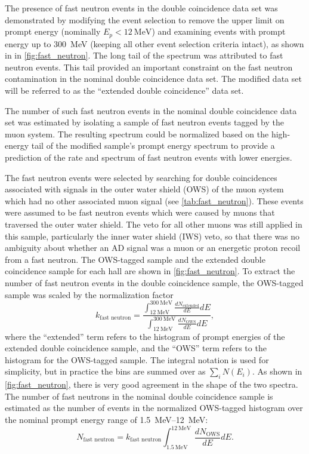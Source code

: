 The presence of fast neutron events in the double coincidence data set
was demonstrated by modifying the event selection
to remove the upper limit on prompt energy (nominally $E_p < \SI{12}{\MeV}$)
and examining events with prompt energy up to \SI{300}{\MeV}
(keeping all other event selection criteria intact),
as shown in in \cref{fig:fast_neutron}.
The long tail of the spectrum was attributed to fast neutron events.
This tail provided an important constraint on the fast neutron contamination
in the nominal double coincidence data set.
The modified data set will be referred to as the
``extended double coincidence'' data set.

The number of such fast neutron events in the nominal double coincidence data set
was estimated by isolating a sample of fast neutron events
tagged by the muon system.
The resulting spectrum could be normalized based on the high-energy tail
of the modified sample's prompt energy spectrum
to provide a prediction of the rate and spectrum of fast neutron events
with lower energies.

The fast neutron events were selected by searching for
double coincidences associated with signals
in the outer water shield (OWS) of the muon system
which had no other associated muon signal
(see \cref{tab:fast_neutron}).
These events were assumed to be fast neutron events
which were caused by muons that traversed the outer water shield.
The veto for all other muons was still applied in this sample,
particularly the inner water shield (IWS) veto,
so that there was no ambiguity about whether an AD signal
was a muon or an energetic proton recoil from a fast neutron.
The OWS-tagged sample and the extended double coincidence sample for each hall
are shown in \cref{fig:fast_neutron}.
To extract the number of fast neutron events in the double coincidence sample,
the OWS-tagged sample was scaled by the normalization factor
\begin{equation}\label{eq:fast_neutron_integral}
    k_\text{fast neutron} = \frac{
        \int_{\SI{12}{\MeV}}^{\SI{300}{\MeV}} \frac{dN_{\text{extended}}}{dE} dE
    }{
        \int_{\SI{12}{\MeV}}^{\SI{300}{\MeV}} \frac{dN_{\text{OWS}}}{dE} dE
    },
\end{equation}
where the ``extended'' term refers to the histogram of prompt energies
of the extended double coincidence sample,
and the ``OWS'' term refers to the histogram for the OWS-tagged sample.
The integral notation is used for simplicity,
but in practice the bins are summed over as $\sum_i N(E_i)$.
As shown in \cref{fig:fast_neutron},
there is very good agreement in the shape of the two spectra.
The number of fast neutrons in the nominal double coincidence sample
is estimated as the number of events in the normalized OWS-tagged histogram
over the nominal prompt energy range of \SIrange{1.5}{12}{\MeV}:
\begin{equation}\label{eq:fast_neutron_count}
    N_\text{fast neutron} = k_\text{fast neutron}
    \int_{\SI{1.5}{\MeV}}^{\SI{12}{\MeV}} \frac{dN_{\text{OWS}}}{dE} dE.
\end{equation}

